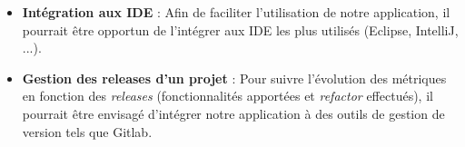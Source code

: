 \documentclass{scrartcl}
\begin{document}
\begin{itemize}
        \item \textbf{Intégration aux IDE} : Afin de faciliter l'utilisation de notre application, il pourrait être opportun de l'intégrer aux IDE les plus utilisés (Eclipse, IntelliJ, ...).
        
        \item \textbf{Gestion des releases d'un projet} : Pour suivre l'évolution des métriques en fonction des \emph{releases} (fonctionnalités apportées et \emph{refactor} effectués), il pourrait être envisagé d'intégrer notre application à des outils de gestion de version tels que Gitlab.
       
    \end{itemize}




\pagebreak


\end{document}
